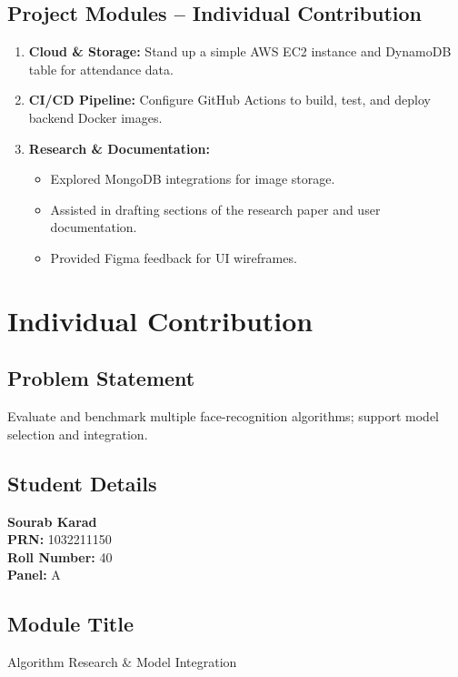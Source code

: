 \documentclass[openany]{report}
\begin{document}
\section{Project Modules – Individual Contribution}
\begin{enumerate}
  \item \textbf{Cloud \& Storage:} Stand up a simple AWS EC2 instance and DynamoDB table for attendance data.
  \item \textbf{CI/CD Pipeline:} Configure GitHub Actions to build, test, and deploy backend Docker images.
  \item \textbf{Research \& Documentation:}
    \begin{itemize}
      \item Explored MongoDB integrations for image storage.
      \item Assisted in drafting sections of the research paper and user documentation.
      \item Provided Figma feedback for UI wireframes.
    \end{itemize}
\end{enumerate}

\chapter{Individual Contribution}
\section{Problem Statement}
Evaluate and benchmark multiple face-recognition algorithms; support model selection and integration.

\section{Student Details}
\textbf{Sourab Karad} \\
\textbf{PRN:} 1032211150 \\
\textbf{Roll Number:} 40 \\
\textbf{Panel:} A \\

\section{Module Title}
Algorithm Research \& Model Integration
\end{document}
